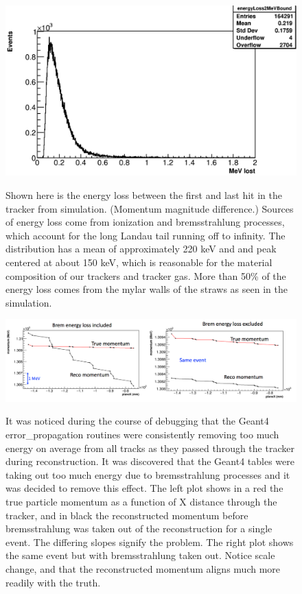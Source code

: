 \documentclass{article}
\begin{document}
\begin{figure}[h]
\caption{Shown here is the energy loss between the first and last hit in the tracker from simulation. (Momentum magnitude difference.) Sources of energy loss come from ionization and bremsstrahlung processes, which account for the long Landau tail running off to infinity. The distribution has a mean of approximately 220 keV and and peak centered at about 150 keV, which is reasonable for the material composition of our trackers and tracker gas. More than 50\% of the energy loss comes from the mylar walls of the straws as seen in the simulation.}
\centering
\includegraphics[width=1.0\textwidth]{eLoss}
\label{fig:eLoss}
\end{figure}

\begin{figure}[h]
\caption{It was noticed during the course of debugging that the Geant4 error\_propagation routines were consistently removing too much energy on average from all tracks as they passed through the tracker during reconstruction. It was discovered that the Geant4 tables were taking out too much energy due to bremsstrahlung processes and it was decided to remove this effect. The left plot shows in a red the true particle momentum as a function of X distance through the tracker, and in black the reconstructed momentum before bremsstrahlung was taken out of the reconstruction for a single event. The differing slopes signify the problem. The right plot shows the same event but with bremsstrahlung taken out. Notice scale change, and that the reconstructed momentum aligns much more readily with the truth.}
\centering
\includegraphics[width=1.0\textwidth]{bremComparison}
\label{fig:bremComparison}
\end{figure}
\end{document}

